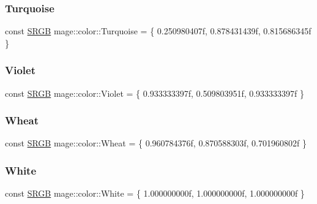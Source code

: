 \subsubsection{\texorpdfstring{Turquoise}{Turquoise}}
{\footnotesize\ttfamily const \hyperlink{structmage_1_1_s_r_g_b}{S\+R\+GB} mage\+::color\+::\+Turquoise = \{ 0.\+250980407f, 0.\+878431439f, 0.\+815686345f \}}

\hypertarget{namespacemage_1_1color_a74cf2fb38b14a5967a005a96bc7235aa}{}\label{namespacemage_1_1color_a74cf2fb38b14a5967a005a96bc7235aa} 
\subsubsection{\texorpdfstring{Violet}{Violet}}
{\footnotesize\ttfamily const \hyperlink{structmage_1_1_s_r_g_b}{S\+R\+GB} mage\+::color\+::\+Violet = \{ 0.\+933333397f, 0.\+509803951f, 0.\+933333397f \}}

\hypertarget{namespacemage_1_1color_a23729819ad160712bf0b57590ccf3ff9}{}\label{namespacemage_1_1color_a23729819ad160712bf0b57590ccf3ff9} 
\subsubsection{\texorpdfstring{Wheat}{Wheat}}
{\footnotesize\ttfamily const \hyperlink{structmage_1_1_s_r_g_b}{S\+R\+GB} mage\+::color\+::\+Wheat = \{ 0.\+960784376f, 0.\+870588303f, 0.\+701960802f \}}

\hypertarget{namespacemage_1_1color_a727b7cc976b22af2949cec8bebdb3e74}{}\label{namespacemage_1_1color_a727b7cc976b22af2949cec8bebdb3e74} 
\subsubsection{\texorpdfstring{White}{White}}
{\footnotesize\ttfamily const \hyperlink{structmage_1_1_s_r_g_b}{S\+R\+GB} mage\+::color\+::\+White = \{ 1.\+000000000f, 1.\+000000000f, 1.\+000000000f \}}

\hypertarget{namespacemage_1_1color_a772d2000efd8f14d3f8bf1d44161b9c2}{}\label{namespacemage_1_1color_a772d2000efd8f14d3f8bf1d44161b9c2} 
